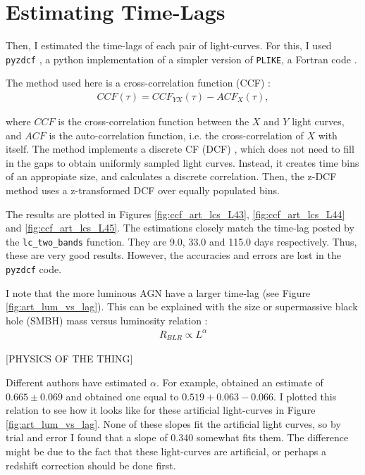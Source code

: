 \documentclass[letterpaper, oneside]{article}
\begin{document}
\section{Estimating Time-Lags}

Then, I estimated the time-lags of each pair of light-curves. For this, I used \texttt{pyzdcf} \cite{pyzdcf_docs}, a python implementation of a simpler version of \texttt{PLIKE}, a Fortran code \cite{Alexander_2013, tal_alexander_software}.

The method used here is a cross-correlation function (CCF) \cite{White_Peterson_1994}:
\begin{align}
	CCF(\tau) = CCF_{YX}(\tau) - ACF_{X}(\tau),
\end{align}

\noindent where $CCF$ is the cross-correlation function between the $X$ and $Y$ light curves, and $ACF$ is the auto-correlation function, i.e. the cross-correlation of $X$ with itself. The method implements a discrete CF (DCF) \cite{Edelson_Krolik_1988}, which does not need to fill in the gaps to obtain uniformly sampled light curves. Instead, it creates time bins of an appropiate size, and calculates a discrete correlation. Then, the z-DCF method uses a z-transformed DCF \cite{Alexander_1997} over equally populated bins.

The results are plotted in Figures \ref{fig:ccf_art_lcs_L43}, \ref{fig:ccf_art_lcs_L44} and \ref{fig:ccf_art_lcs_L45}. The estimations closely match the time-lag posted by the \texttt{lc\_two\_bands} function. They are 9.0, 33.0 and 115.0 days respectively. Thus, these are very good results. However, the accuracies and errors are lost in the \texttt{pyzdcf} code.

I note that the more luminous AGN have a larger time-lag (see Figure \ref{fig:art_lum_vs_lag}). This can be explained with the size or supermassive black hole (SMBH) mass versus luminosity relation \cite{Kaspi_2007, Bentz_2009}:
\begin{align}
	R_{BLR} \propto L^{\alpha}
\end{align}

[PHYSICS OF THE THING]

Different authors have estimated $\alpha$. For example, \cite{Kaspi_2005} obtained an estimate of $0.665 \pm 0.069$ and \cite{Bentz_2009} obtained one equal to $0.519 + 0.063 - 0.066$. I plotted this relation to see how it looks like for these artificial light-curves in Figure \ref{fig:art_lum_vs_lag}. None of these slopes fit the artificial light curves, so by trial and error I found that a slope of 0.340 somewhat fits them. The difference might be due to the fact that these light-curves are artificial, or perhaps a redshift correction should be done first.
\end{document}

